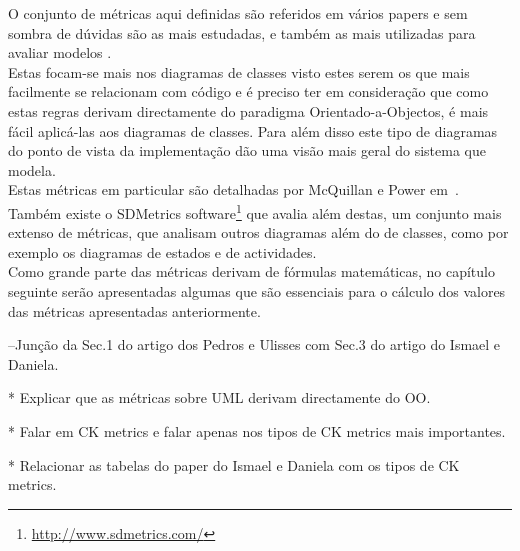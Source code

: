 O conjunto de métricas aqui definidas são referidos em vários papers e sem sombra de dúvidas são as mais estudadas, e também as mais utilizadas para avaliar modelos \uml.\\
Estas focam-se mais nos diagramas de classes visto estes serem os que mais facilmente se relacionam com código e é preciso ter em consideração que como estas regras derivam 
directamente do paradigma Orientado-a-Objectos, é mais fácil aplicá-las aos diagramas de classes. Para além disso este tipo de diagramas do ponto de vista da implementação 
dão uma visão mais geral do sistema que modela.\\
Estas métricas em particular são detalhadas por McQuillan e Power em~\cite{Power}. Também existe o SDMetrics software\footnote{{\url{http://www.sdmetrics.com/}}} que avalia além destas, um conjunto
 mais extenso de métricas, que analisam outros diagramas além do de classes, como por exemplo os diagramas de estados e de actividades. \\ 
Como grande parte das métricas derivam de fórmulas matemáticas, no capítulo seguinte serão apresentadas algumas que são essenciais para o cálculo dos
valores das métricas apresentadas anteriormente.


--Junção da Sec.1 do artigo dos Pedros e Ulisses com Sec.3 do artigo do Ismael e Daniela.

    * Explicar que as métricas sobre UML derivam directamente do OO.

    * Falar em CK metrics e falar apenas nos tipos de CK metrics mais importantes.

    * Relacionar as tabelas do paper do Ismael e Daniela com os tipos de CK metrics.

